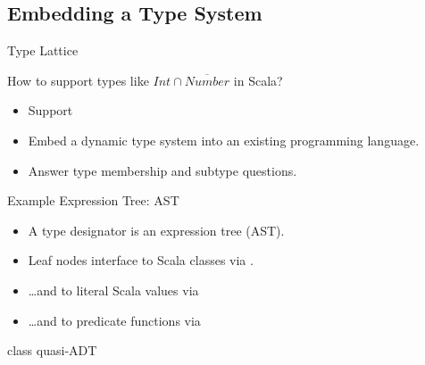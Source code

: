\subsection{Embedding a Type System}

{  
\begin{frame}{ Type Lattice}

  How to support types like \textcolor{greeny}{$Int\cap\overline{Number}$} in Scala?

  \begin{itemize}
  \item   Support 
  \item Embed a dynamic type system into an existing programming language.
  \item Answer type membership and subtype questions.
  \end{itemize}

\end{frame}
}



\newsavebox\tdast
\begin{lrbox}{\tdast}
  \begin{minipage}{11cm}
    
  \end{minipage}
\end{lrbox}


\begin{frame}{Example  Expression Tree: AST}
  \usebox\tdast

  \medskip

  \centering

  \scalebox{0.7}{}
  \begin{itemize}
  \item A type designator is an expression tree (AST).
  \item Leaf nodes interface to Scala classes via . 
  \item \ldots and to literal Scala values via 
  \item \ldots and to predicate functions via 
 \end{itemize}
\end{frame}


\begin{frame}{ class quasi-ADT}
  \scalebox{0.95}{}

\end{frame}


